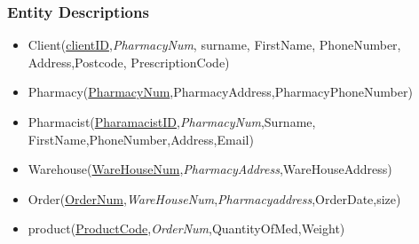 \subsubsection{Entity Descriptions}
\begin{itemize}
\item Client(\underline{clientID},\emph{PharmacyNum}, surname, FirstName, PhoneNumber, Address,Postcode, PrescriptionCode)
\item Pharmacy(\underline{PharmacyNum},PharmacyAddress,PharmacyPhoneNumber)
\item Pharmacist(\underline{PharamacistID},\emph{PharmacyNum},Surname,
FirstName,PhoneNumber,Address,Email)
\item Warehouse(\underline{WareHouseNum},\emph{PharmacyAddress},WareHouseAddress)
\item Order(\underline{OrderNum},\emph{WareHouseNum},\emph{Pharmacyaddress},OrderDate,size)
\item product(\underline{ProductCode},\emph{OrderNum},QuantityOfMed,Weight)

\end{itemize}
